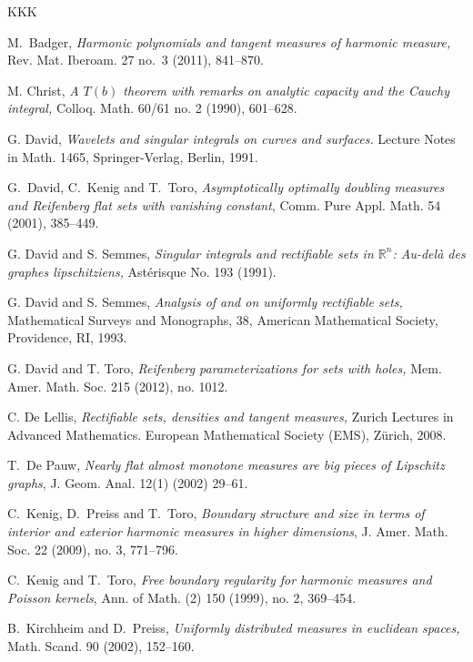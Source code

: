 \documentclass[11pt]{amsart}
\newcommand{\R}{{\mathbb R}}       %
\theoremstyle{definition}
\theoremstyle{remark}
\numberwithin{equation}{section}
\begin{document}
\begin{thebibliography}{KKK}

 M.\ Badger, {\em  Harmonic polynomials and tangent measures of harmonic measure,}
 Rev. Mat. Iberoam. 27 no.\ 3 (2011), 841--870.
 
 M. Christ, {\em A $T(b)$ theorem with remarks on analytic capacity and the Cauchy integral,} Colloq. Math. 60/61  no. 2 (1990),
601--628. 

 G. David, {\em Wavelets and singular integrals on curves
and surfaces.} Lecture Notes in Math. {1465}, Springer-Verlag, Berlin,
1991.

 G.\ David, C.\ Kenig and T.\ Toro, {\em Asymptotically optimally
doubling measures and Reifenberg flat sets with vanishing constant},
Comm. Pure Appl. Math.  54 (2001), 385--449.


 G. David and S. Semmes, {\em Singular integrals and
rectifiable sets in $\R^n$: Au-del\`a des graphes lipschitziens,} Ast\'{e}risque
No. 193 (1991).

 G. David and S. Semmes, {\em Analysis of and on uniformly
rectifiable sets,} Mathematical Surveys and Monographs, 38, American
Mathematical Society, Providence, RI, 1993.

 G. David and T. Toro, 
{\em 
Reifenberg parameterizations for sets with holes,} 
Mem. Amer. Math. Soc. 215 (2012), no. 1012.


 C. De Lellis, {\em Rectifiable sets, densities and tangent measures,} Zurich Lectures in Advanced Mathematics. European Mathematical Society (EMS), Z\"urich, 2008.

 T.\ De Pauw, {\em Nearly flat almost monotone measures
are big pieces of Lipschitz graphs},  J. Geom. Anal. 12(1) (2002) 29--61.

 C.\ Kenig, D.\ Preiss and T.\ Toro, {\em
Boundary structure and size in terms of interior and exterior harmonic measures in higher dimensions},
J. Amer. Math. Soc. 22 (2009), no. 3, 771--796. 

 C.\ Kenig and T.\ Toro, {\em Free boundary regularity for harmonic measures and Poisson kernels}, Ann. of Math. (2) 150 (1999), no. 2, 369--454. 

 B.\ Kirchheim and D.\ Preiss, {\em Uniformly distributed measures in
euclidean spaces,} Math. Scand. 90 (2002), 152--160.



\end{thebibliography}
\end{document}

